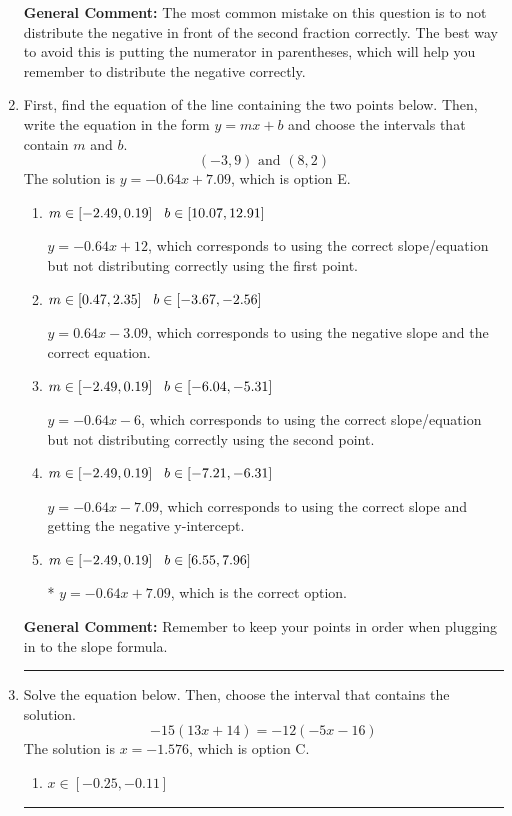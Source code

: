 \documentclass{extbook}[14pt]
\newcommand{\litem}[1]{\item #1

\rule{\textwidth}{0.4pt}}
\begin{document}
\begin{enumerate}
{\textbf{General Comment:} The most common mistake on this question is to not distribute the negative in front of the second fraction correctly. The best way to avoid this is putting the numerator in parentheses, which will help you remember to distribute the negative correctly.
}
\litem{
First, find the equation of the line containing the two points below. Then, write the equation in the form $ y=mx+b $ and choose the intervals that contain $m$ and $b$.
\[ (-3, 9) \text{ and } (8, 2) \]The solution is \( y = -0.64x + 7.09 \), which is option E.\begin{enumerate}[label=\Alph*.]
\item \( m \in [-2.49, 0.19] \hspace*{3mm} b \in [10.07, 12.91] \)

 $y = -0.64x + 12$, which corresponds to using the correct slope/equation but not distributing correctly using the first point.
\item \( m \in [0.47, 2.35] \hspace*{3mm} b \in [-3.67, -2.56] \)

 $y = 0.64x -3.09$, which corresponds to using the negative slope and the correct equation.
\item \( m \in [-2.49, 0.19] \hspace*{3mm} b \in [-6.04, -5.31] \)

 $y = -0.64x -6$, which corresponds to using the correct slope/equation but not distributing correctly using the second point.
\item \( m \in [-2.49, 0.19] \hspace*{3mm} b \in [-7.21, -6.31] \)

 $y = -0.64x -7.09$, which corresponds to using the correct slope and getting the negative y-intercept.
\item \( m \in [-2.49, 0.19] \hspace*{3mm} b \in [6.55, 7.96] \)

* $y = -0.64x + 7.09$, which is the correct option.
\end{enumerate}

\textbf{General Comment:} Remember to keep your points in order when plugging in to the slope formula.
}
\litem{
Solve the equation below. Then, choose the interval that contains the solution.
\[ -15(13x + 14) = -12(-5x -16) \]The solution is \( x = -1.576 \), which is option C.\begin{enumerate}[label=\Alph*.]
\item \( x \in [-0.25, -0.11] \)


\end{enumerate}}
\end{enumerate}
\end{document}
